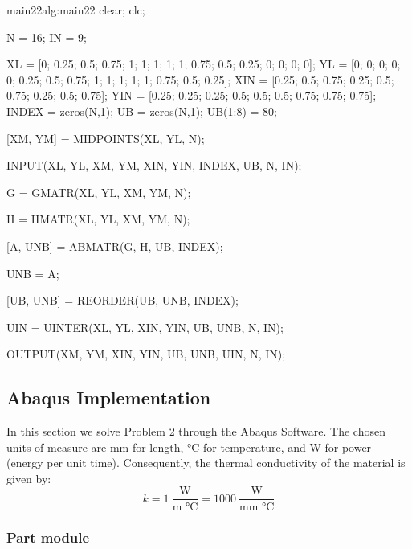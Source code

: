 \begin{matlab}{main22}{alg:main22}
clear; clc; 

N = 16;
IN = 9;

XL = [0; 0.25; 0.5; 0.75; 1; 1; 1; 1; 1; 0.75; 0.5; 0.25; 0; 0; 0; 0];
YL = [0; 0; 0; 0; 0; 0.25; 0.5; 0.75; 1; 1; 1; 1; 1; 0.75; 0.5; 0.25];
XIN = [0.25; 0.5; 0.75; 0.25; 0.5; 0.75; 0.25; 0.5; 0.75];
YIN = [0.25; 0.25; 0.25; 0.5; 0.5; 0.5; 0.75; 0.75; 0.75];
INDEX = zeros(N,1);
UB = zeros(N,1); UB(1:8) = 80;

[XM, YM] = MIDPOINTS(XL, YL, N);


INPUT(XL, YL, XM, YM, XIN, YIN, INDEX, UB, N, IN);

G = GMATR(XL, YL, XM, YM, N);

H = HMATR(XL, YL, XM, YM, N);

[A, UNB] = ABMATR(G, H, UB, INDEX);

UNB = A\UNB;

[UB, UNB] = REORDER(UB, UNB, INDEX);

UIN = UINTER(XL, YL, XIN, YIN, UB, UNB, N, IN);

OUTPUT(XM, YM, XIN, YIN, UB, UNB, UIN, N, IN);

\end{matlab}

\newpage

\subsection{Abaqus Implementation}
\label{sub:Abaqus_implementation3}%

In this section we solve Problem 2 through the Abaqus Software. The chosen units of measure are mm for length, °C for temperature, and W for power (energy per unit time). Consequently, the thermal conductivity of the material is given by:
\begin{equation}
\label{eq:conductivity}
k=1\ \frac{\text{W}}{\text{m °C}}=1000\ \frac{\text{W}}{\text{mm °C}}
\end{equation}

\subsubsection{Part module}

